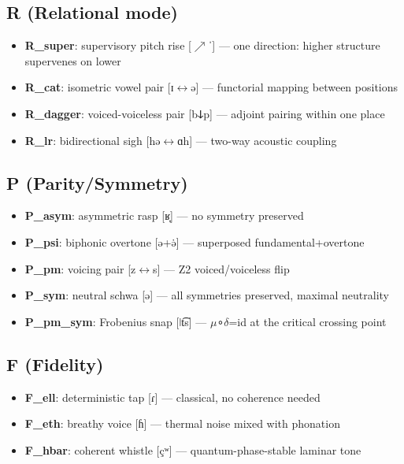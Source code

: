 \documentclass[12pt,a4paper]{article}
\begin{document}
\subsection{R (Relational mode)}

\begin{itemize}
    \item \textbf{R\_super}: supervisory pitch rise {[}$\nearrow$ˈ{]} --- one direction: higher structure supervenes on lower
    \item \textbf{R\_cat}: isometric vowel pair {[}ɪ$\leftrightarrow$ə{]} --- functorial mapping between positions
    \item \textbf{R\_dagger}: voiced-voiceless pair {[}bↆp{]} --- adjoint pairing within one place
    \item \textbf{R\_lr}: bidirectional sigh {[}hə$\leftrightarrow$ɑh{]} --- two-way acoustic coupling
\end{itemize}

\subsection{P (Parity/Symmetry)}

\begin{itemize}
    \item \textbf{P\_asym}: asymmetric rasp {[}ʁ̞{]} --- no symmetry preserved
    \item \textbf{P\_psi}: biphonic overtone {[}ə+ə̇{]} --- superposed fundamental+overtone
    \item \textbf{P\_pm}: voicing pair {[}z$\leftrightarrow$s{]} --- Z2 voiced/voiceless flip
    \item \textbf{P\_sym}: neutral schwa {[}ə{]} --- all symmetries preserved, maximal neutrality
    \item \textbf{P\_pm\_sym}: Frobenius snap {[}ǀt͡s{]} --- $\mu$∘$\delta$=id at the critical crossing point
\end{itemize}

\subsection{F (Fidelity)}

\begin{itemize}
    \item \textbf{F\_ell}: deterministic tap {[}ɾ{]} --- classical, no coherence needed
    \item \textbf{F\_eth}: breathy voice {[}ɦ{]} --- thermal noise mixed with phonation
    \item \textbf{F\_hbar}: coherent whistle {[}çʷ{]} --- quantum-phase-stable laminar tone
\end{itemize}
\end{document}
